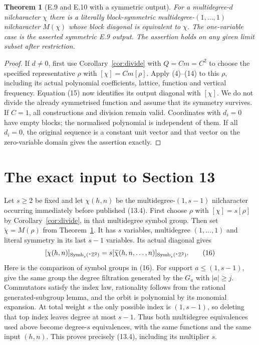 \documentclass[11pt]{article}
\newtheorem{theorem}{Theorem}
\begin{document}
\begin{theorem}[E.9 and E.10 with a symmetric output]\label{thm:multi}
For a multidegree-$d$ nilcharacter $\chi$ there is a literally
block-symmetric multidegree-$(1,\ldots,1)$ nilcharacter $M(\chi)$
whose block diagonal is equivalent to $\chi$. The one-variable case
is the asserted symmetric E.9 output. The assertion holds on any
given limit subset after restriction.
\end{theorem}
\begin{proof}
If $d\ne0$, first use Corollary~\ref{cor:divide} with $Q=Cm=C^2$
to choose the specified representative $\rho$ with $[\chi]=Cm[\rho]$.
Apply (4)--(14) to this $\rho$, including its actual polynomial
coefficients, lattice, function and vertical frequency. Equation (15)
now identifies its output diagonal with $[\chi]$. We do not divide
the already symmetrised function and assume that its symmetry survives.
If $C=1$, all constructions and division remain valid. Coordinates
with $d_i=0$ have empty blocks; the normalised polynomial is independent
of them. If all $d_i=0$, the original sequence is a constant unit vector
and that vector on the zero-variable domain gives the assertion exactly.
\end{proof}

\section{The exact input to Section 13}\label{sec:join}
Let $s\geq2$ be fixed and let $\chi(h,n)$ be the multidegree-$(1,s-1)$
nilcharacter occurring immediately before published (13.4).
First choose $\rho$ with $[\chi]=s[\rho]$ by
Corollary~\ref{cor:divide}, in that multidegree symbol group.
Then set $\widetilde\chi=M(\rho)$ from Theorem~\ref{thm:multi}.
It has $s$ variables, multidegree $(1,\ldots,1)$ and literal symmetry
in its last $s-1$ variables. Its actual diagonal gives
\[
 [\chi(h,n)]_{\mathrm{Symb}_s({}^*\mathbb Z^2)}
   =s[\widetilde\chi(h,n,\ldots,n)]_{\mathrm{Symb}_s({}^*\mathbb Z^2)}.
                                                        \tag{16}
\]
Here is the comparison of symbol groups in (16). For support $a\leq(1,s-1)$,
give the same group the degree filtration generated by the $G_a$ with
$|a|\geq j$. Commutators satisfy the index law, rationality follows
from the rational generated-subgroup lemma, and the orbit is polynomial
by its monomial expansion. At total weight $s$ the only possible index
is $(1,s-1)$, so deleting that top index leaves degree at most $s-1$.
Thus both multidegree equivalences used above become degree-$s$
equivalences, with the same functions and the same input $(h,n)$.
This proves precisely (13.4), including its multiplier $s$.
\end{document}
